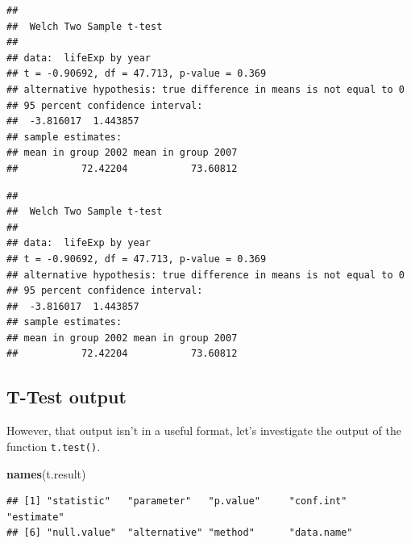 \documentclass[]{book}
\makeatletter
\newenvironment{Shaded}{\begin{snugshade}}{\end{snugshade}}
\newcommand{\KeywordTok}[1]{\textcolor[rgb]{0.13,0.29,0.53}{\textbf{#1}}}
\newcommand{\DataTypeTok}[1]{\textcolor[rgb]{0.13,0.29,0.53}{#1}}
\newcommand{\DecValTok}[1]{\textcolor[rgb]{0.00,0.00,0.81}{#1}}
\newcommand{\StringTok}[1]{\textcolor[rgb]{0.31,0.60,0.02}{#1}}
\newcommand{\OperatorTok}[1]{\textcolor[rgb]{0.81,0.36,0.00}{\textbf{#1}}}
\newcommand{\NormalTok}[1]{#1}
\newenvironment{kframe}{%
\medskip{}
\setlength{\fboxsep}{.8em}
 \def\at@end@of@kframe{}%
 \ifinner\ifhmode%
  \def\at@end@of@kframe{\end{minipage}}%
  \begin{minipage}{\columnwidth}%
 \fi\fi%
 \def\FrameCommand##1{\hskip\@totalleftmargin \hskip-\fboxsep
 \colorbox{shadecolor}{##1}\hskip-\fboxsep
     \hskip-\linewidth \hskip-\@totalleftmargin \hskip\columnwidth}%
 \MakeFramed {\advance\hsize-\width
   \@totalleftmargin\z@ \linewidth\hsize
   \@setminipage}}%
 {\par\unskip\endMakeFramed%
 \at@end@of@kframe}
\renewenvironment{Shaded}{\begin{kframe}}{\end{kframe}}
\makeatother
\begin{document}
\begin{verbatim}
## 
##  Welch Two Sample t-test
## 
## data:  lifeExp by year
## t = -0.90692, df = 47.713, p-value = 0.369
## alternative hypothesis: true difference in means is not equal to 0
## 95 percent confidence interval:
##  -3.816017  1.443857
## sample estimates:
## mean in group 2002 mean in group 2007 
##           72.42204           73.60812
\end{verbatim}

\begin{Shaded}
\end{Shaded}

\begin{verbatim}
## 
##  Welch Two Sample t-test
## 
## data:  lifeExp by year
## t = -0.90692, df = 47.713, p-value = 0.369
## alternative hypothesis: true difference in means is not equal to 0
## 95 percent confidence interval:
##  -3.816017  1.443857
## sample estimates:
## mean in group 2002 mean in group 2007 
##           72.42204           73.60812
\end{verbatim}

\subsection{T-Test output}\label{t-test-output}

However, that output isn't in a useful format, let's investigate the
output of the function \texttt{t.test()}.

\begin{Shaded}
\begin{Highlighting}[]
\KeywordTok{names}\NormalTok{(t.result)}
\end{Highlighting}
\end{Shaded}

\begin{verbatim}
## [1] "statistic"   "parameter"   "p.value"     "conf.int"    "estimate"   
## [6] "null.value"  "alternative" "method"      "data.name"
\end{verbatim}
\end{document}
